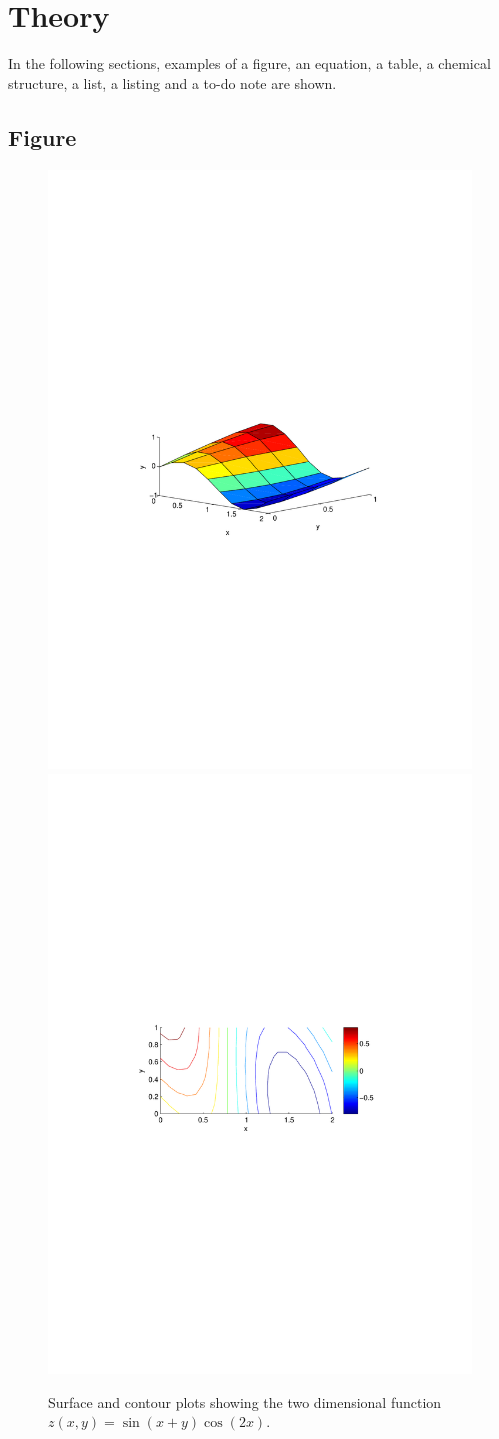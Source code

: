 \chapter{Theory}

In the following sections, examples of a figure, an equation, a table, a chemical structure, a list, a listing and a to-do note are shown.

\section{Figure}
\begin{figure}[H]
\centering
\includegraphics[width=0.45\linewidth, trim=3cm 11cm 3cm 11cm]{figure/X.pdf}
\includegraphics[width=0.45\linewidth, trim=3cm 11cm 3cm 11cm]{figure/Y.pdf}
\caption{Surface and contour plots showing the two dimensional function $z(x,y)=\sin(x+y)\cos(2x)$.}
\end{figure}

